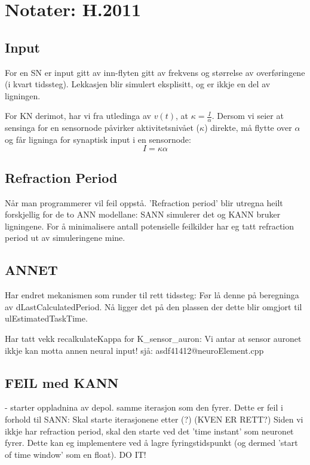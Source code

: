\section{Notater: H.2011}
	\subsection{Input}
	For en SN er input gitt av inn-flyten gitt av frekvens og størrelse av overføringene (i kvart tidssteg).
	Lekkasjen blir simulert eksplisitt, og er ikkje en del av ligningen.

	For KN derimot, har vi fra utledinga av $v(t)$, at $\kappa = \frac{I}{\alpha}$. 
	Dersom vi seier at sensinga for en sensornode påvirker aktivitetsnivået ($\kappa$) direkte, må flytte over $\alpha$ og får ligninga for synaptisk input i en sensornode:
\begin{equation}
	I = \kappa \alpha
\end{equation}

	\subsection{Refraction Period}
	Når man programmerer vil feil oppstå. 
	'Refraction period' blir utregna heilt forskjellig for de to ANN modellane: SANN simulerer det og KANN bruker ligningene.
	For å minimalisere antall potensielle feilkilder har eg tatt refraction period ut av simuleringene mine. 

	\subsection{ANNET}
	Har endret mekanismen som runder til rett tidssteg: Før lå denne på beregninga av dLastCalculatedPeriod. Nå ligger det på den plassen der dette blir omgjort til ulEstimatedTaskTime.	

	Har tatt vekk recalkulateKappa for K_sensor_auron: Vi antar at sensor auronet ikkje kan motta annen neural input! sjå: asdf41412@neuroElement.cpp

	\subsection{FEIL med KANN}
	- starter oppladnina av depol. samme iterasjon som den fyrer. Dette er feil i forhold til SANN: Skal starte iterasjonene etter (?)
	(KVEN ER RETT?)
	Siden vi ikkje har refraction period, skal den starte ved det 'time instant' som neuronet fyrer. Dette kan eg implementere ved å lagre fyringstidspunkt (og dermed 'start of time window' som en float). DO IT!

